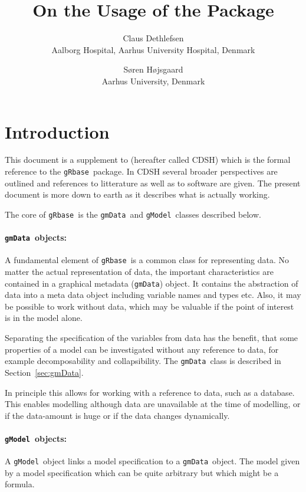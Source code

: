 \documentclass{article}
\author{
  Claus Dethlefsen\\Aalborg Hospital, Aarhus University Hospital, Denmark
\and 
  S{\o}ren H{\o}jsgaard\\Aarhus University, Denmark
}
\title{On the Usage of the  \pkg{gRbase} Package}
\def\pkg#1{\texttt{#1}}
\def\code#1{\texttt{#1}}
\def\gRbase                 {\pkg{gRbase}}
\def\gmData            {\code{gmData}}
\def\gmData             {\code{gmData}}
\def\gModel             {\code{gModel}} %
\begin{document}
\maketitle
\tableofcontents

\parindent0pt\parskip5pt

\section{Introduction}


This document is a supplement to \cite{cd:shd:05} (hereafter called
CDSH) which is the formal reference to the \gRbase\ package. In CDSH
several broader perspectives are outlined and references to
litterature as well as to software are given. The present document is
more down to earth as it describes what is actually working.

The core of \gRbase\ is the \gmData\ and \gModel\ classes described below.


\paragraph{\protect\gmData\ objects:}

A fundamental element of \gRbase\ is a common class for representing
data. No matter the actual representation of data, the important
characteristics are contained in a graphical metadata (\gmData)
object. It contains the abstraction of data into a meta data object
including variable names and types etc. 
Also, it may be possible to work without data,
which may be valuable if the point of interest is in the model alone.

Separating the specification of the variables from data has the
benefit, that some properties of a model can be investigated without
any reference to data, for example decomposability and collapsibility.
The \gmData\ class is described in Section~\ref{sec:gmData}.

In principle this allows for working with a reference to data, such as
a database. This enables modelling although data are unavailable at
the time of modelling, or if the data-amount is huge or if the data
changes dynamically.


\paragraph{\protect\gModel\ objects:}

A \gModel\ object links a model specification to a \gmData\ object. 
The model given by a model specification which can be quite
arbitrary but which might be a formula. 
\end{document}
